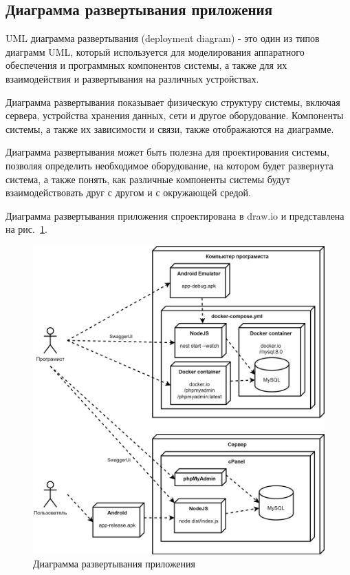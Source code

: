 \subsection*{Диаграмма развертывания приложения}

UML диаграмма развертывания (deployment diagram) - это один из типов диаграмм UML, который используется для моделирования аппаратного обеспечения и программных компонентов системы,
а также для их взаимодействия и развертывания на различных устройствах.

Диаграмма развертывания показывает физическую структуру системы, включая сервера, устройства хранения данных, сети и другое оборудование.
Компоненты системы, а также их зависимости и связи, также отображаются на диаграмме.

Диаграмма развертывания может быть полезна для проектирования системы, позволяя определить необходимое оборудование, на котором будет развернута система,
а также понять, как различные компоненты системы будут взаимодействовать друг с другом и с окружающей средой.

Диаграмма развертывания приложения спроектирована в draw.io \cite{drawio} и представлена на рис.~\ref{fig:UML_deployment_diagram}.

\begin{figure}[!htb]
    \centering

    \includegraphics[width=18cm]
    {images/UML/UML_deployment_diagram.png}

    \caption{Диаграмма развертывания приложения}

    \label{fig:UML_deployment_diagram}
\end{figure}
